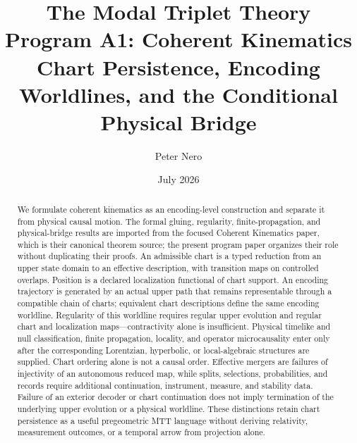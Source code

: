 \documentclass[11pt]{article}
\title{The Modal Triplet Theory Program A1: Coherent Kinematics\\
\large Chart Persistence, Encoding Worldlines, and the Conditional Physical Bridge}
\author{Peter Nero}
\date{July 2026}
\begin{document}
\maketitle

\begin{abstract}
We formulate coherent kinematics as an encoding-level construction and
separate it from physical causal motion. The formal gluing, regularity,
finite-propagation, and physical-bridge results are imported from the focused
Coherent Kinematics paper, which is their canonical theorem source; the
present program paper organizes their role without duplicating their proofs.
An admissible chart is a typed
reduction from an upper state domain to an effective description, with
transition maps on controlled overlaps. Position is a declared localization
functional of chart support. An encoding trajectory is generated by an actual
upper path that remains representable through a compatible chain of charts;
equivalent chart descriptions define the same encoding worldline. Regularity
of this worldline requires regular upper evolution and regular chart and
localization maps---contractivity alone is insufficient. Physical timelike and
null classification, finite propagation, locality, and operator
microcausality enter only after the corresponding Lorentzian, hyperbolic, or
local-algebraic structures are supplied. Chart ordering alone is not a causal
order. Effective mergers are failures of injectivity of an autonomous reduced
map, while splits, selections, probabilities, and records require additional
continuation, instrument, measure, and stability data. Failure of an exterior
decoder or chart continuation does not imply termination of the underlying
upper evolution or a physical worldline. These distinctions retain chart
persistence as a useful pregeometric MTT language without deriving relativity,
measurement outcomes, or a temporal arrow from projection alone.
\end{abstract}
\end{document}
